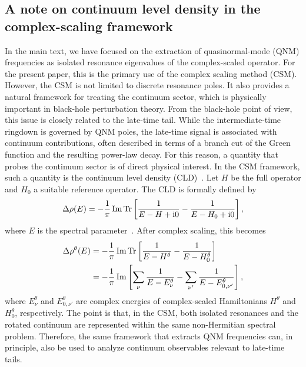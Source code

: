 \subsection{A note on continuum level density in the complex-scaling framework}
\label{src:2604_20442:app:cld}
In the main text, we have focused on the extraction of quasinormal-mode (QNM)
frequencies as isolated resonance eigenvalues of the complex-scaled operator.
For the present paper, this is the primary use of the complex scaling method
(CSM).
However, the CSM is not limited to discrete resonance poles.
It also provides a natural framework for treating the continuum sector, which
is physically important in black-hole perturbation theory.
From the black-hole point of view, this issue is closely related to the
late-time tail.
While the intermediate-time ringdown is governed by QNM poles, the late-time
signal is associated with continuum contributions, often described in terms of
a branch cut of the Green function and the resulting power-law decay.
For this reason, a quantity that probes the continuum sector is of direct
physical interest.
In the CSM framework, such a quantity is the continuum level density (CLD)~\cite{Suzuki:2005wv}.
Let $H$ be the full operator and $H_0$ a suitable reference operator.
The CLD is formally defined by
\begin{align}
    \Delta \rho(E)
    =
    -\frac{1}{\pi}
    \operatorname{Im}
    \operatorname{Tr}
    \left[
        \frac{1}{E-H+\mathrm{i} 0}
        -
        \frac{1}{E-H_0+\mathrm{i} 0}
    \right],
    \label{src:2604_20442:eq:cld_def_appendix}
\end{align}
where $E$ is the spectral parameter~\cite{Avishai1985}.
After complex scaling, this becomes
\begin{align}
    \Delta \rho^\theta(E)
    &=
    -\frac{1}{\pi}
    \operatorname{Im}
    \operatorname{Tr}
    \left[
        \frac{1}{E-H^\theta}
        -
        \frac{1}{E-H_0^\theta}
    \right]
    \\
    &=
    -\frac{1}{\pi}
    \operatorname{Im}
    \left[
        \sum_\nu\frac{1}{E-E^\theta_\nu}
        -
        \sum_{\nu'}\frac{1}{E-E_{0,\nu'}^\theta}
    \right],
    \label{src:2604_20442:eq:cld_csm_appendix}
\end{align}
where $E^\theta_\nu$ and $E_{0,\nu'}^\theta$ are complex energies of complex-scaled Hamiltonians $H^\theta$ and $H^\theta_0$, respectively.
The point is that, in the CSM, both isolated resonances and the rotated
continuum are represented within the same non-Hermitian spectral problem.
Therefore, the same framework that extracts QNM frequencies can, in principle,
also be used to analyze continuum observables relevant to late-time tails.
